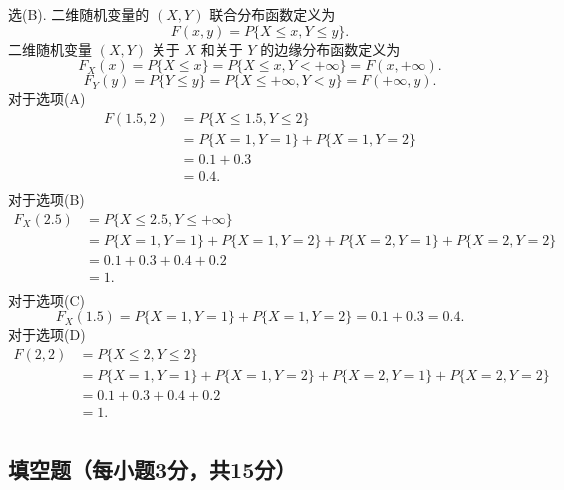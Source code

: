 \documentclass{article}
\begin{document}
\begin{solution}
    选(B).  二维随机变量的 $(X,Y)$ 联合分布函数定义为
    $$
        F(x,y) = P\{X \leqslant x, Y \leqslant y\}.
    $$
    二维随机变量 $(X,Y)$ 关于 $X$ 和关于 $Y$ 的边缘分布函数定义为
    $$
        F_X(x) = P\{X \leqslant x\}
        = P\{X \leqslant x, Y < +\infty\}
        = F(x, +\infty).
    $$
    $$
        F_Y(y) = P\{Y \leqslant y\}
        = P\{X \leqslant +\infty, Y < y\}
        = F(+\infty, y).
    $$
    对于选项(A)
    $$
        \begin{aligned}
            F(1.5, 2)
             & = P\{X \leqslant 1.5, Y \leqslant 2\} \\
             & = P\{X=1, Y=1\} + P\{X=1, Y=2\}       \\
             & = 0.1 + 0.3                           \\
             & = 0.4.                                \\
        \end{aligned}
    $$
    对于选项(B)
    $$
        \begin{aligned}
            F_X(2.5)
             & = P\{X \leqslant 2.5, Y \leqslant +\infty\}                     \\
             & = P\{X=1, Y=1\} + P\{X=1, Y=2\} + P\{X=2, Y=1\} + P\{X=2, Y=2\} \\
             & = 0.1+0.3+0.4+0.2                                               \\
             & = 1.                                                            \\
        \end{aligned}
    $$
    对于选项(C)
    $$
        F_X(1.5) = P\{X=1, Y=1\} + P\{X=1, Y=2\} = 0.1 + 0.3 = 0.4.
    $$
    对于选项(D)
    $$
        \begin{aligned}
            F(2,2)
             & = P\{X \leqslant 2, Y \leqslant 2\}                             \\
             & = P\{X=1, Y=1\} + P\{X=1, Y=2\} + P\{X=2, Y=1\} + P\{X=2, Y=2\} \\
             & = 0.1+0.3+0.4+0.2                                               \\
             & = 1.                                                            \\
        \end{aligned}
    $$
\end{solution}


\subsection{填空题（每小题3分，共15分）}
\end{document}
